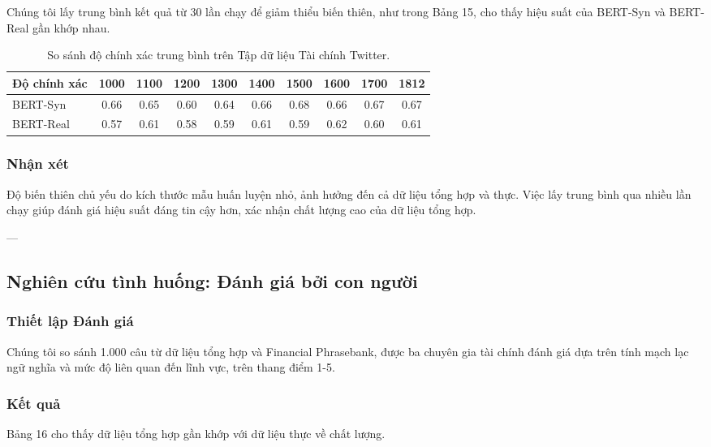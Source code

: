\documentclass[a4paper,10pt]{article}
\begin{document}
Chúng tôi lấy trung bình kết quả từ 30 lần chạy để giảm thiểu biến thiên, như trong Bảng 15, cho thấy hiệu suất của BERT-Syn và BERT-Real gần khớp nhau.

\begin{table}[h]
    \renewcommand{\thetable}{15}
    \centering
    \caption{So sánh độ chính xác trung bình trên Tập dữ liệu Tài chính Twitter.}
    \label{tab:avg_accuracy_twitter}
    \begin{tabular}{lccccccccc}
        \hline
        Độ chính xác & 1000 & 1100 & 1200 & 1300 & 1400 & 1500 & 1600 & 1700 & 1812 \\
        \hline
        BERT-Syn  & 0.66 & 0.65 & 0.60 & 0.64 & 0.66 & 0.68 & 0.66 & 0.67 & 0.67 \\
        BERT-Real & 0.57 & 0.61 & 0.58 & 0.59 & 0.61 & 0.59 & 0.62 & 0.60 & 0.61 \\
        \hline
    \end{tabular}
\end{table}

\subsubsection{Nhận xét} 

Độ biến thiên chủ yếu do kích thước mẫu huấn luyện nhỏ, ảnh hưởng đến cả dữ liệu tổng hợp và thực. Việc lấy trung bình qua nhiều lần chạy giúp đánh giá hiệu suất đáng tin cậy hơn, xác nhận chất lượng cao của dữ liệu tổng hợp.

---

\subsection{ Nghiên cứu tình huống: Đánh giá bởi con người}

\subsubsection{Thiết lập Đánh giá}

Chúng tôi so sánh 1.000 câu từ dữ liệu tổng hợp và Financial Phrasebank, được ba chuyên gia tài chính đánh giá dựa trên tính mạch lạc ngữ nghĩa và mức độ liên quan đến lĩnh vực, trên thang điểm 1-5.

\subsubsection{Kết quả
} 
Bảng 16 cho thấy dữ liệu tổng hợp gần khớp với dữ liệu thực về chất lượng.
\end{document}
